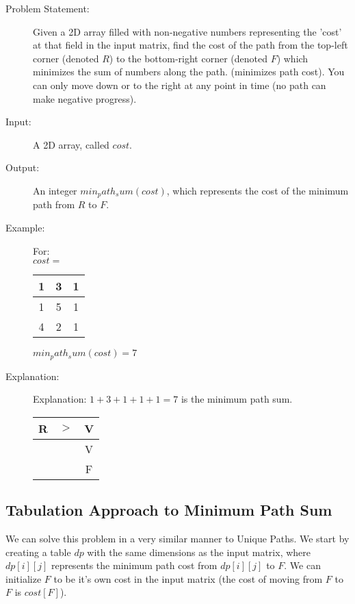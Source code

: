 \begin{description}
    \item[Problem Statement:]
        Given a 2D array filled with non-negative numbers representing the 'cost' at that field in the input matrix,
        find the cost of the path from the top-left corner (denoted $R$) to the bottom-right corner (denoted $F$) which minimizes the sum of numbers along the path.
        (minimizes path cost).
        You can only move down or to the right at any point in time (no path can make negative progress).

    \item[Input:]
        A 2D array, called $cost$.
        
    \item[Output:]
        An integer $min_path_sum(cost)$, which represents the cost of the minimum path from $R$ to $F$.
        
    \item[Example:] For:\\
    $cost = $
    \begin{table}[H]
        \centering
        \begin{tabular}{|c|c|c|}
            \hline
            1 & 3 & 1 \\
            \hline
            1 & 5 & 1 \\
            \hline
            4 & 2 & 1 \\
            \hline
        \end{tabular}
    \end{table}

    $min_path_sum(cost) = 7$

    \item[Explanation:]
        Explanation: $1 + 3 + 1 + 1 + 1 = 7$ is the minimum path sum.
        \begin{table}[H]
            \centering
            \begin{tabular}{|c|c|c|}
                \hline
                R & $>$ & V \\
                \hline
                 &  & V \\
                \hline
                 &  & F \\
                \hline
            \end{tabular}
        \end{table}
        
\end{description}

\subsection{Tabulation Approach to Minimum Path Sum}
We can solve this problem in a very similar manner to Unique Paths.
We start by creating a table $dp$ with the same dimensions as the input matrix, where $dp[i][j]$ represents the minimum path cost from $dp[i][j]$ to $F$.
We can initialize $F$ to be it's own cost in the input matrix (the cost of moving from $F$ to $F$ is $cost[F]$).

